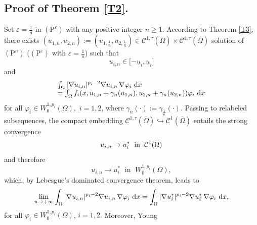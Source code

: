 \documentclass[11pt]{amsart}
\theoremstyle{definition}
\theoremstyle{remark}
\numberwithin{equation}{section}
\begin{document}
\subsection{\textbf{Proof of Theorem \protect\ref{T2}.}}

Set $\varepsilon =\frac{1}{n}$ in $(\mathrm{P}^{\varepsilon })$ with any
positive integer $n\geq 1.$ According to Theorem \ref{T3}, there exists $%
(u_{1,n},u_{2,n}):=(u_{1,\frac{1}{n}},u_{2,\frac{1}{n}})\in \mathcal{C}%
^{1,\tau }(\overline{\Omega })\times \mathcal{C}^{1,\tau }(\overline{\Omega }%
)$ solution of $(\mathrm{P}^{n})$ ($(\mathrm{P}^{\varepsilon })$ with $%
\varepsilon =\frac{1}{n}$) such that 
\begin{equation}
u_{i,n}\in \lbrack -\underline{u}_{i},\underline{u}_{i}]  \label{36}
\end{equation}%
and 
\begin{equation}
\begin{array}{l}
\int_{\Omega }|\nabla u_{i,n}|^{p_{i}-2}\nabla u_{i,n}\text{\thinspace }%
\nabla \varphi _{i}\text{ }\mathrm{d}x \\ 
=\int_{\Omega }f_{i}(x,u_{1,n}+\gamma _{n}(u_{1,n}),u_{2,n}+\gamma
_{n}(u_{2,n}))\varphi _{i}\text{ }\mathrm{d}x%
\end{array}
\label{37}
\end{equation}%
for all $\varphi _{i}\in W_{0}^{1,p_{i}}(\Omega ),$ $i=1,2$, where $\gamma
_{n}(\cdot ):=\gamma _{\frac{1}{n}}(\cdot )$. Passing to relabeled
subsequences, the compact embedding $\mathcal{C}^{1,\tau }(\overline{\Omega }%
)\hookrightarrow \mathcal{C}^{1}(\overline{\Omega })$ entails the strong
convergence%
\begin{equation}
u_{i,n}\rightarrow u_{i}^{\ast }\;\text{\ in }\;\mathcal{C}^{1}(\overline{%
\Omega })  \label{38}
\end{equation}%
and therefore%
\begin{equation}
u_{i,n}\rightarrow u_{i}^{\ast }\;\text{\ in }\;W_{0}^{1,p_{i}}(\Omega ),
\label{39}
\end{equation}%
which, by Lebesgue's dominated convergence theorem, leads to%
\begin{equation}
\lim_{n\rightarrow +\infty }\int_{\Omega }|\nabla u_{i,n}|^{p_{i}-2}\nabla
u_{i,n}\text{\thinspace }\nabla \varphi _{i}\text{ }\mathrm{d}x=\int_{\Omega
}|\nabla u_{i}^{\ast }|^{p_{i}-2}\nabla u_{i}^{\ast }\text{\thinspace }%
\nabla \varphi _{i}\text{ }\mathrm{d}x,  \label{40}
\end{equation}%
for all $\varphi _{i}\in W_{0}^{1,p_{i}}(\Omega )$, $i=1,2.$ Moreover, Young
\end{document}
